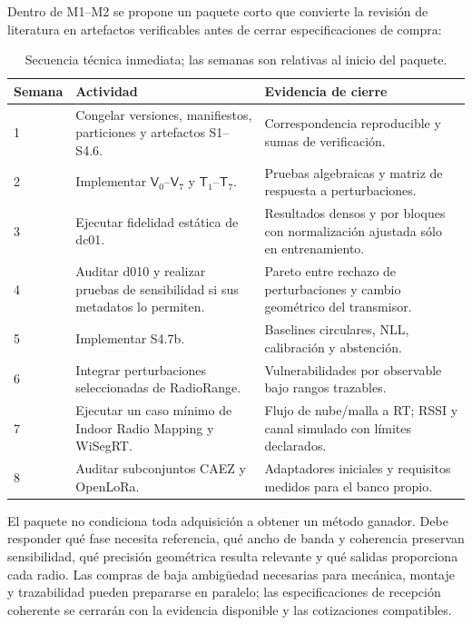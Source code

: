 Dentro de M1--M2 se propone un paquete corto que convierte la revisión de literatura
en artefactos verificables antes de cerrar especificaciones de compra:
\begin{table}[htbp]
\centering\small
\caption{Secuencia técnica inmediata; las semanas son relativas al inicio del paquete.}
\label{tab:eight_week_package}
\begin{tabularx}{\textwidth}{P{1.5cm}L L}
\toprule
Semana & Actividad & Evidencia de cierre\\
 & Congelar versiones, manifiestos, particiones y artefactos S1--S4.6. &
Correspondencia reproducible y sumas de verificación.\\
2 & Implementar $\mathsf V_0$--$\mathsf V_7$ y $\mathsf T_1$--$\mathsf T_7$. &
Pruebas algebraicas y matriz de respuesta a perturbaciones.\\
3 & Ejecutar fidelidad estática de dc01. & Resultados densos y por bloques con
normalización ajustada sólo en entrenamiento.\\
4 & Auditar d010 y realizar pruebas de sensibilidad si sus metadatos lo permiten. &
Pareto entre rechazo de perturbaciones y cambio geométrico del transmisor.\\
5 & Implementar S4.7b. & Baselines circulares, NLL, calibración y abstención.\\
6 & Integrar perturbaciones seleccionadas de RadioRange. & Vulnerabilidades por
observable bajo rangos trazables.\\
7 & Ejecutar un caso mínimo de Indoor Radio Mapping y WiSegRT. & Flujo de nube/malla
a RT; RSSI y canal simulado con límites declarados.\\
8 & Auditar subconjuntos CAEZ y OpenLoRa. & Adaptadores iniciales y requisitos
medidos para el banco propio.\\
\bottomrule
\end{tabularx}
\end{table}

El paquete no condiciona toda adquisición a obtener un método ganador. Debe responder
qué fase necesita referencia, qué ancho de banda y coherencia preservan sensibilidad,
qué precisión geométrica resulta relevante y qué salidas proporciona cada radio.
Las compras de baja ambigüedad necesarias para mecánica, montaje y trazabilidad pueden
prepararse en paralelo; las especificaciones de recepción coherente se cerrarán con
la evidencia disponible y las cotizaciones compatibles.

